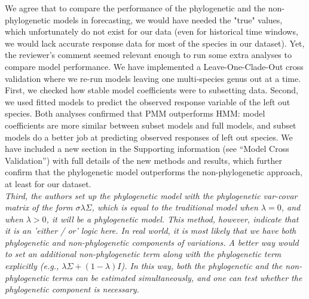 \documentclass[11pt]{article}
\begin{document}
We agree that to compare the performance of the phylogenetic and the non-phylogenetic models in forecasting, we would have needed the "true" values, which unfortunately do not exist for our data (even for historical time windows, we would lack accurate response data for most of the species in our dataset). Yet, the reviewer's comment seemed relevant enough to run some extra analyses to compare model performance. We have implemented a Leave-One-Clade-Out cross validation where we re-run models leaving one multi-species genus out at a time. First, we checked how stable model coefficients were to subsetting data. Second, we used fitted models to predict the observed response variable of the left out species. Both analyses confirmed that PMM outperforms HMM: model coefficients are more similar between subset models and full models, and subset models do a better job at predicting observed responses of left out species. We have included a new section in the Supporting information (see ``Model Cross Validation'') with full details of the new methods and results, which further confirm that the phylogenetic model outperforms the non-phylogenetic approach, at least for our dataset.\\


\emph{Third, the authors set up the phylogenetic model with the phylogenetic var-covar matrix of the form $\sigma\lambda\Sigma$, which is equal to the traditional model when $\lambda=0$, and when $\lambda>0$, it will be a phylogenetic model. This method, however, indicate that it is an 'either / or' logic here. In real world, it is most likely that we have both phylogenetic and non-phylogenetic components of variations. A better way would to set an additional non-phylogenetic term along with the phylogenetic term explicitly (e.g., $\lambda \Sigma + (1-\lambda)I$). In this way, both the phylogenetic and the non-phylogenetic terms can be estimated simultaneously, and one can test whether the phylogenetic component is necessary.}\\
\end{document}

